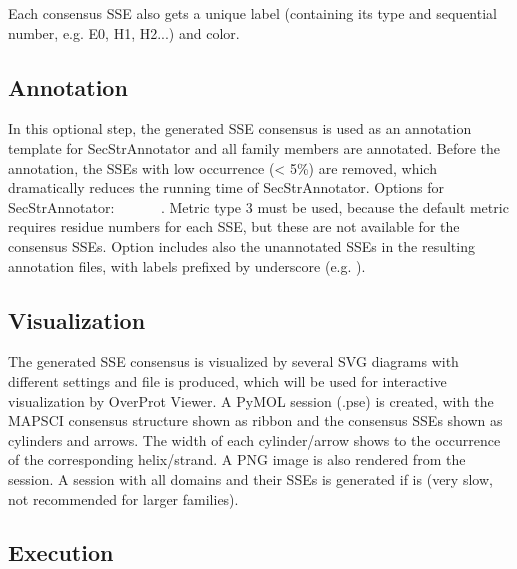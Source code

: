 \documentclass{article}
\begin{document}
Each consensus SSE also gets a unique label (containing its type and sequential number, e.g. E0, H1, H2...) and color.

\subsection{Annotation}

In this optional step, the generated SSE consensus is used
as an annotation template for SecStrAnnotator and all family members are
annotated. Before the annotation, the SSEs with low occurrence
(\textless{} 5\%) are removed, which dramatically reduces the running
time of SecStrAnnotator. Options for SecStrAnnotator:
 ~
~ ~
~. 
Metric type 3 must be used, because the default metric requires 
residue numbers for each SSE, but these are not available for the consensus SSEs. 
Option  includes also the unannotated SSEs in the resulting annotation files, 
with labels prefixed by underscore (e.g. ).



\subsection{Visualization}

The generated SSE consensus is visualized by several SVG diagrams with
different settings and  file is produced, which
will be used for interactive visualization by OverProt Viewer. 
A PyMOL session (.pse) is created, with the MAPSCI consensus structure 
shown as ribbon and the consensus SSEs shown as cylinders and arrows.
The width of each cylinder/arrow shows to the occurrence of the corresponding helix/strand.
A PNG image is also rendered from the session. 
A session with all domains and their SSEs is
generated if  is
 (very slow, not recommended for larger families).



\subsection{Execution}
\end{document}
